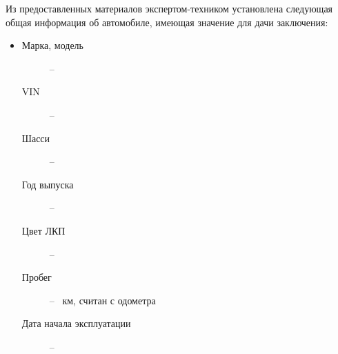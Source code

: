 	\par Из предоставленных материалов   экспертом-техником установлена следующая общая информация об автомобиле, имеющая значение для дачи заключения:
 \parbox[]{10cm}{}
\begin{itemize}
	\item[ ] 
	\begin{description}
		\item[Марка, модель] -- 
		\item[VIN] -- \vin
		\item[Шасси] -- 
		\item[Год выпуска] -- 
		\item[Цвет ЛКП] -- 
		\item[Пробег] --  \, км, считан с одометра
		\item[Дата начала эксплуатации] -- 
	\end{description}
\end{itemize}
%
%					
	
